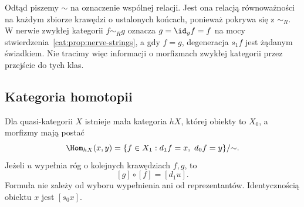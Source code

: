 Odtąd piszemy $\sim$ na oznaczenie wspólnej relacji. Jest ona relacją równoważności na każdym zbiorze krawędzi o ustalonych końcach, ponieważ pokrywa się z $\sim_R$. W nerwie zwykłej kategorii $f\sim_R g$ oznacza $g=\id_y f=f$ na mocy stwierdzenia~\ref{cat:prop:nerve-strings}, a gdy $f=g$, degeneracja $s_1f$ jest żądanym świadkiem. Nie tracimy więc informacji o morfizmach zwykłej kategorii przez przejście do tych klas.

\subsection{Kategoria homotopii}

\begin{twierdzenie}\label{cat:thm:homotopy-category}
Dla quasi-kategorii $X$ istnieje mała kategoria $hX$, której obiekty to $X_0$, a morfizmy mają postać
\[
 \Hom_{hX}(x,y)=
 \{f\in X_1:d_1f=x,\ d_0f=y\}/{\sim}.
\]
Jeżeli $u$ wypełnia róg o kolejnych krawędziach $f,g$, to
\[
 [g]\circ[f]=[d_1u].
\]
Formuła nie zależy od wyboru wypełnienia ani od reprezentantów. Identycznością obiektu $x$ jest $[s_0x]$.
\end{twierdzenie}
